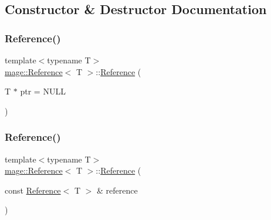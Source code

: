 \subsection{Constructor \& Destructor Documentation}
\hypertarget{classmage_1_1_reference_a62039d823993670fdb8c3ddedcc794c7}{}\label{classmage_1_1_reference_a62039d823993670fdb8c3ddedcc794c7} 
\subsubsection{\texorpdfstring{Reference()}{Reference()}\hspace{0.1cm}{\footnotesize\ttfamily [1/2]}}
{\footnotesize\ttfamily template$<$typename T$>$ \\
\hyperlink{classmage_1_1_reference}{mage\+::\+Reference}$<$ T $>$\+::\hyperlink{classmage_1_1_reference}{Reference} (\begin{DoxyParamCaption}\item[{T $\ast$}]{ptr = {\ttfamily NULL} }\end{DoxyParamCaption})}

\hypertarget{classmage_1_1_reference_abc471d0d652884353af99f7c668a467d}{}\label{classmage_1_1_reference_abc471d0d652884353af99f7c668a467d} 
\subsubsection{\texorpdfstring{Reference()}{Reference()}\hspace{0.1cm}{\footnotesize\ttfamily [2/2]}}
{\footnotesize\ttfamily template$<$typename T$>$ \\
\hyperlink{classmage_1_1_reference}{mage\+::\+Reference}$<$ T $>$\+::\hyperlink{classmage_1_1_reference}{Reference} (\begin{DoxyParamCaption}\item[{const \hyperlink{classmage_1_1_reference}{Reference}$<$ T $>$ \&}]{reference }\end{DoxyParamCaption})}

\hypertarget{classmage_1_1_reference_a88dd14871881ba478b5a86ce011775e7}{}\label{classmage_1_1_reference_a88dd14871881ba478b5a86ce011775e7} 
